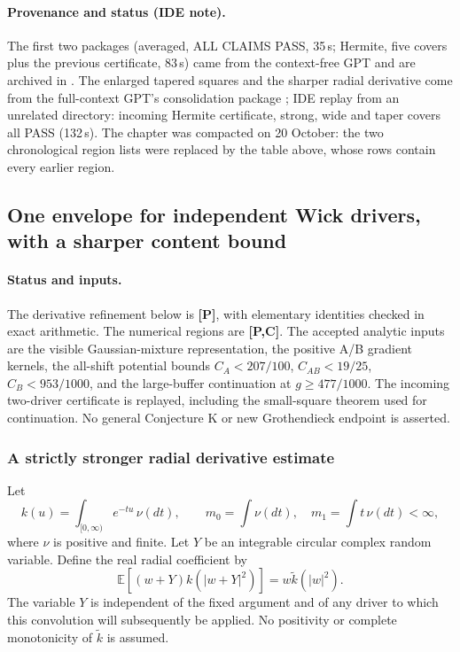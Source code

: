 \paragraph{Provenance and status (IDE note).} The first two packages (averaged,  ALL CLAIMS PASS, 35\,s; Hermite, five covers plus the previous
certificate, 83\,s) came from the context-free GPT and are archived in . The enlarged tapered squares and the sharper radial
derivative come from the full-context GPT's consolidation package ; IDE replay  from an
unrelated directory: incoming Hermite certificate, strong, wide and taper covers all PASS (132\,s). The chapter was compacted on 20 October: the two chronological region
lists were replaced by the table above, whose rows contain every earlier region.

\subsection{One envelope for independent Wick drivers, with a sharper content bound}
\label{sec:kcompact-master}

\paragraph{Status and inputs.}
The derivative refinement below is \textbf{[P]}, with elementary identities
checked in exact arithmetic. The numerical regions are \textbf{[P,C]}.
The accepted analytic inputs are the visible Gaussian-mixture representation,
the positive A/B gradient kernels, the all-shift potential bounds
$C_A<207/100$, $C_{AB}<19/25$, $C_B<953/1000$, and the large-buffer
continuation at $g\ge477/1000$. The incoming two-driver certificate is
replayed, including the small-square theorem used for continuation.
No general Conjecture K or new Grothendieck endpoint is asserted.

\subsubsection{A strictly stronger radial derivative estimate}
Let
\[
 k(u)=\int_{[0,\infty)}e^{-tu}\,\nu(dt),\qquad
 m_0=\int\nu(dt),\quad m_1=\int t\,\nu(dt)<\infty,
\]
where $\nu$ is positive and finite. Let $Y$ be an integrable circular
complex random variable. Define the real radial coefficient by
\[
 \mathbb E[(w+Y)k(|w+Y|^2)]=w\widetilde k(|w|^2).
\]
The variable $Y$ is independent of the fixed argument and of any driver
to which this convolution will subsequently be applied. No positivity or
complete monotonicity of $\widetilde k$ is assumed.


